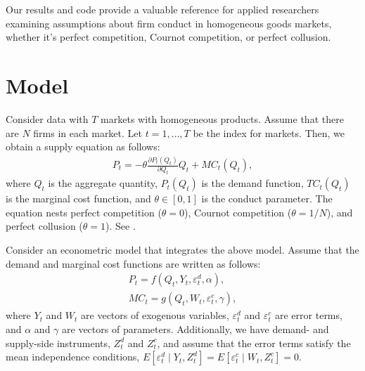 \documentclass[11pt, a4paper]{article}
\begin{document}
Our results and code provide a valuable reference for applied researchers examining assumptions about firm conduct in homogeneous goods markets, whether it's perfect competition, Cournot competition, or perfect collusion.

\section{Model}
Consider data with $T$ markets with homogeneous products.
Assume that there are $N$ firms in each market.
Let $t = 1,\ldots, T$ be the index for markets.
Then, we obtain a supply equation as follows:
\begin{align}
     P_{t} = -\theta\frac{\partial P_{t}(Q_{t})}{\partial Q_{t}}Q_{t} + MC_{t}(Q_{t}),\label{eq:supply_equation}
\end{align}
where $Q_{t}$ is the aggregate quantity, $P_{t}(Q_{t})$ is the demand function, $TC_{t}(Q_{t})$ is the marginal cost function, and $\theta\in[0,1]$ is  the conduct parameter. 
The equation nests perfect competition ($\theta=0$), Cournot competition ($\theta=1/N$), and perfect collusion ($\theta=1$). See \cite{bresnahan1982oligopoly}. 

Consider an econometric model that integrates the above model.
Assume that the demand and marginal cost functions are written as follows: 
\begin{align}
    P_{t} = f(Q_{t}, Y_{t}, \varepsilon^{d}_{t}, \alpha), \label{eq:demand}\\
    MC_{t} = g(Q_{t}, W_{t}, \varepsilon^{c}_{t}, \gamma),\label{eq:marginal_cost}
\end{align}
where $Y_{t}$ and $W_{t}$ are vectors of exogenous variables, $\varepsilon^{d}_{t}$ and $\varepsilon^{c}_{t}$ are error terms, and $\alpha$ and $\gamma$ are vectors of parameters.
Additionally, we have demand- and supply-side instruments, $Z^{d}_{t}$ and $Z^{c}_{t}$, and assume that the error terms satisfy the mean independence conditions, $E[\varepsilon^{d}_{t}\mid Y_{t}, Z^{d}_{t}] = E[\varepsilon^{c}_{t} \mid W_{t}, Z^{c}_{t}] =0$.
\end{document}
